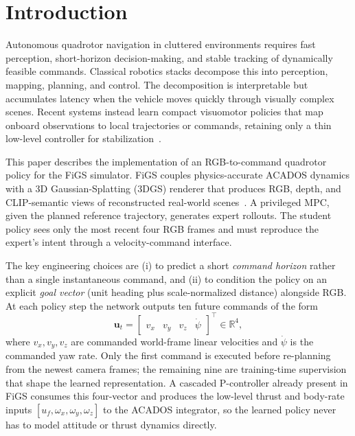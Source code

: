 \documentclass[10pt,twocolumn,letterpaper]{article}
\begin{document}
\section{Introduction}
\label{sec:intro}

Autonomous quadrotor navigation in cluttered environments requires fast perception, short-horizon decision-making, and stable tracking of dynamically feasible commands. Classical robotics stacks decompose this into perception, mapping, planning, and control. The decomposition is interpretable but accumulates latency when the vehicle moves quickly through visually complex scenes. Recent systems instead learn compact visuomotor policies that map onboard observations to local trajectories or commands, retaining only a thin low-level controller for stabilization~\cite{loquercio2021learning,low2024sousvide}.

This paper describes the implementation of an RGB-to-command quadrotor policy for the FiGS simulator. FiGS couples physics-accurate ACADOS dynamics with a 3D Gaussian-Splatting (3DGS) renderer that produces RGB, depth, and CLIP-semantic views of reconstructed real-world scenes~\cite{low2024sousvide,kerbl2023gaussian}. A privileged MPC, given the planned reference trajectory, generates expert rollouts. The student policy sees only the most recent four RGB frames and must reproduce the expert's intent through a velocity-command interface.

The key engineering choices are (i) to predict a short \emph{command horizon} rather than a single instantaneous command, and (ii) to condition the policy on an explicit \emph{goal vector} (unit heading plus scale-normalized distance) alongside RGB. At each policy step the network outputs ten future commands of the form
\begin{equation}
\label{eq:command}
\mathbf{u}_t = \begin{bmatrix} v_x & v_y & v_z & \dot{\psi} \end{bmatrix}^\top \in \mathbb{R}^4,
\end{equation}
where $v_x, v_y, v_z$ are commanded world-frame linear velocities and $\dot{\psi}$ is the commanded yaw rate. Only the first command is executed before re-planning from the newest camera frames; the remaining nine are training-time supervision that shape the learned representation. A cascaded P-controller already present in FiGS consumes this four-vector and produces the low-level thrust and body-rate inputs $[u_f, \omega_x, \omega_y, \omega_z]$ to the ACADOS integrator, so the learned policy never has to model attitude or thrust dynamics directly.
\end{document}
